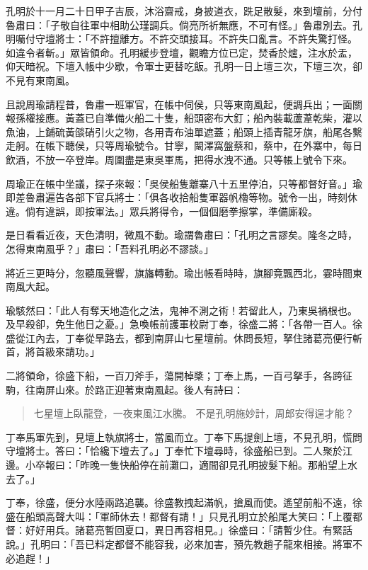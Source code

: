孔明於十一月二十日甲子吉辰，沐浴齋戒，身披道衣，跣足散髮，來到壇前，分付魯肅曰：「子敬自往軍中相助公瑾調兵。倘亮所祈無應，不可有怪。」魯肅別去。孔明囑付守壇將士：「不許擅離方。不許交頭接耳。不許失口亂言。不許失驚打怪。如違令者斬。」眾皆領命。孔明緩步登壇，觀瞻方位已定，焚香於爐，注水於盂，仰天暗祝。下壇入帳中少歇，令軍士更替吃飯。孔明一日上壇三次，下壇三次，卻不見有東南風。

且說周瑜請程普，魯肅一班軍官，在帳中伺侯，只等東南風起，便調兵出；一面關報孫權接應。黃蓋已自準備火船二十隻，船頭密布大釘；船內裝載蘆葦乾柴，灌以魚油，上鋪硫黃燄硝引火之物，各用青布油單遮蓋；船頭上插青龍牙旗，船尾各繫走舸。在帳下聽侯，只等周瑜號令。甘寧，闞澤窩盤蔡和，蔡中，在外寨中，每日飲酒，不放一卒登岸。周圍盡是東吳軍馬，把得水洩不通。只等帳上號令下來。

周瑜正在帳中坐議，探子來報：「吳侯船隻離寨八十五里停泊，只等都督好音。」瑜即差魯肅遍告各部下官兵將士：「俱各收拾船隻軍器帆櫓等物。號令一出，時刻休違。倘有違誤，即按軍法。」眾兵將得令，一個個磨拳擦掌，準備廝殺。

是日看看近夜，天色清明，微風不動。瑜謂魯肅曰：「孔明之言謬矣。隆冬之時，怎得東南風乎？」肅曰：「吾料孔明必不謬談。」

將近三更時分，忽聽風聲響，旗旛轉動。瑜出帳看時時，旗腳竟飄西北，霎時間東南風大起。

瑜駭然曰：「此人有奪天地造化之法，鬼神不測之術！若留此人，乃東吳禍根也。及早殺卻，免生他日之憂。」急喚帳前護軍校尉丁奉，徐盛二將：「各帶一百人。徐盛從江內去，丁奉從旱路去，都到南屏山七星壇前。休問長短，拏住諸葛亮便行斬首，將首級來請功。」

二將領命，徐盛下船，一百刀斧手，蕩開棹槳；丁奉上馬，一百弓拏手，各跨征駒，往南屏山來。於路正迎著東南風起。後人有詩曰：

\begin{quote}
七星壇上臥龍登，一夜東風江水騰。
不是孔明施妙計，周郎安得逞才能？
\end{quote}

丁奉馬軍先到，見壇上執旗將士，當風而立。丁奉下馬提劍上壇，不見孔明，慌問守壇將士。答曰：「恰纔下壇去了。」丁奉忙下壇尋時，徐盛船已到。二人聚於江邊。小卒報曰：「昨晚一隻快船停在前灘口，適間卻見孔明披髮下船。那船望上水去了。」

丁奉，徐盛，便分水陸兩路追襲。徐盛教拽起滿帆，搶風而使。遙望前船不遠，徐盛在船頭高聲大叫：「軍師休去！都督有請！」只見孔明立於船尾大笑曰：「上覆都督：好好用兵。諸葛亮暫回夏口，異日再容相見。」徐盛曰：「請暫少住。有緊話說。」孔明曰：「吾已料定都督不能容我，必來加害，預先教趙子龍來相接。將軍不必追趕！」

